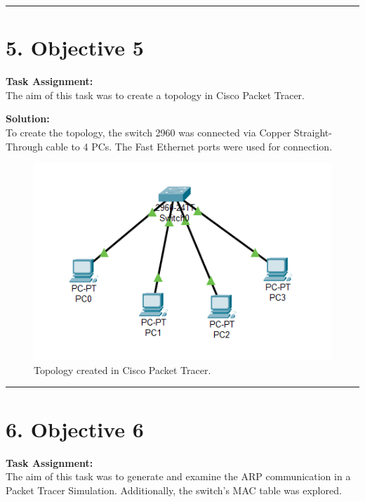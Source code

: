 \documentclass[a4paper,12pt]{article}
\begin{document}
\vspace{1em}
\hrule
\vspace{0.5em}
\pagebreak
\section*{5. Objective 5}

\textbf{Task Assignment:} \\
The aim of this task was to create a topology in Cisco Packet Tracer.

\textbf{Solution:} \\
To create the topology, the switch 2960 was connected via Copper Straight-Through cable to 4 PCs. The Fast Ethernet ports were used for connection.
\begin{figure}[H]
\centering
\includegraphics[width=\linewidth,keepaspectratio]{Pictures_Lab1/objective 5.png}
\caption{Topology created in Cisco Packet Tracer.}
\end{figure}

\vspace{1em}
\hrule
\vspace{0.5em}
\pagebreak
\section*{6. Objective 6}

\textbf{Task Assignment:} \\
The aim of this task was to generate and examine the ARP communication in a Packet Tracer Simulation. Additionally, the switch's MAC table was explored.
\end{document}
